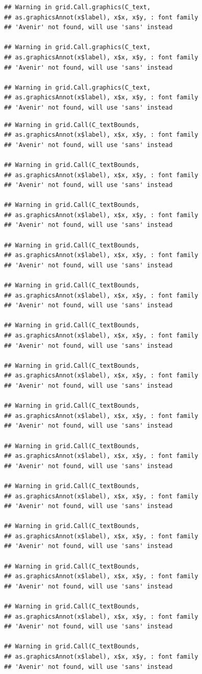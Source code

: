 \documentclass[]{krantz}
\begin{document}
\begin{verbatim}
## Warning in grid.Call.graphics(C_text,
## as.graphicsAnnot(x$label), x$x, x$y, : font family
## 'Avenir' not found, will use 'sans' instead

## Warning in grid.Call.graphics(C_text,
## as.graphicsAnnot(x$label), x$x, x$y, : font family
## 'Avenir' not found, will use 'sans' instead

## Warning in grid.Call.graphics(C_text,
## as.graphicsAnnot(x$label), x$x, x$y, : font family
## 'Avenir' not found, will use 'sans' instead
\end{verbatim}

\begin{verbatim}
## Warning in grid.Call(C_textBounds,
## as.graphicsAnnot(x$label), x$x, x$y, : font family
## 'Avenir' not found, will use 'sans' instead

## Warning in grid.Call(C_textBounds,
## as.graphicsAnnot(x$label), x$x, x$y, : font family
## 'Avenir' not found, will use 'sans' instead

## Warning in grid.Call(C_textBounds,
## as.graphicsAnnot(x$label), x$x, x$y, : font family
## 'Avenir' not found, will use 'sans' instead

## Warning in grid.Call(C_textBounds,
## as.graphicsAnnot(x$label), x$x, x$y, : font family
## 'Avenir' not found, will use 'sans' instead

## Warning in grid.Call(C_textBounds,
## as.graphicsAnnot(x$label), x$x, x$y, : font family
## 'Avenir' not found, will use 'sans' instead

## Warning in grid.Call(C_textBounds,
## as.graphicsAnnot(x$label), x$x, x$y, : font family
## 'Avenir' not found, will use 'sans' instead

## Warning in grid.Call(C_textBounds,
## as.graphicsAnnot(x$label), x$x, x$y, : font family
## 'Avenir' not found, will use 'sans' instead

## Warning in grid.Call(C_textBounds,
## as.graphicsAnnot(x$label), x$x, x$y, : font family
## 'Avenir' not found, will use 'sans' instead

## Warning in grid.Call(C_textBounds,
## as.graphicsAnnot(x$label), x$x, x$y, : font family
## 'Avenir' not found, will use 'sans' instead

## Warning in grid.Call(C_textBounds,
## as.graphicsAnnot(x$label), x$x, x$y, : font family
## 'Avenir' not found, will use 'sans' instead

## Warning in grid.Call(C_textBounds,
## as.graphicsAnnot(x$label), x$x, x$y, : font family
## 'Avenir' not found, will use 'sans' instead

## Warning in grid.Call(C_textBounds,
## as.graphicsAnnot(x$label), x$x, x$y, : font family
## 'Avenir' not found, will use 'sans' instead

## Warning in grid.Call(C_textBounds,
## as.graphicsAnnot(x$label), x$x, x$y, : font family
## 'Avenir' not found, will use 'sans' instead

## Warning in grid.Call(C_textBounds,
## as.graphicsAnnot(x$label), x$x, x$y, : font family
## 'Avenir' not found, will use 'sans' instead
\end{verbatim}
\end{document}
